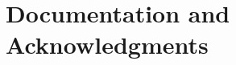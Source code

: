 \documentclass[11pt]{report}
\begin{document}
\chapter{Documentation and Acknowledgments}\label{ch:documentation}
\end{document}
